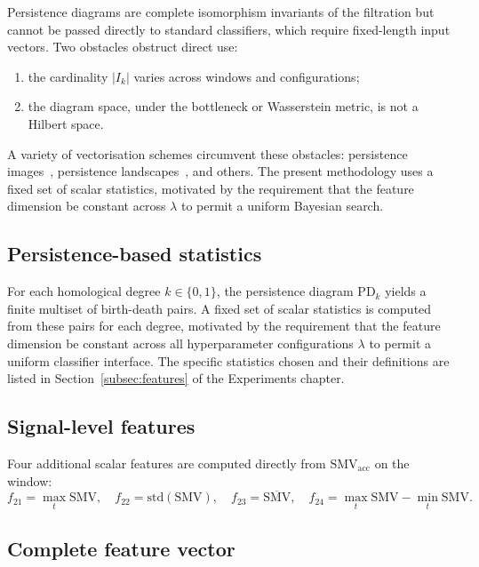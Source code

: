 \documentclass[onluarkali,ingilizce,yukseklisans,karton,LisansustuEgitim]{itutez}
\providecommand{\1}{\mathbf{1}}
\providecommand{\PD}{\mathrm{PD}}
\begin{document}
Persistence diagrams are complete isomorphism invariants of the filtration but cannot be passed directly to standard classifiers, which require fixed-length input vectors. Two obstacles obstruct direct use:
\begin{enumerate}[label=(\roman*)]
  \item the cardinality $|I_k|$ varies across windows and configurations;
  \item the diagram space, under the bottleneck or Wasserstein metric, is not a Hilbert space.
\end{enumerate}
A variety of vectorisation schemes circumvent these obstacles: persistence images~\parencite{adams2017persistence}, persistence landscapes~\parencite{bubenik2015statistical}, and others. The present methodology uses a fixed set of scalar statistics, motivated by the requirement that the feature dimension be constant across $\lambda$ to permit a uniform Bayesian search.

\subsection{Persistence-based statistics}
\label{subsubsec:stats-topo}

For each homological degree $k\in\{0,1\}$, the persistence diagram $\PD_k$ yields a finite multiset of birth-death pairs. A fixed set of scalar statistics is computed from these pairs for each degree, motivated by the requirement that the feature dimension be constant across all hyperparameter configurations $\lambda$ to permit a uniform classifier interface. The specific statistics chosen and their definitions are listed in Section~\ref{subsec:features} of the Experiments chapter.

\subsection{Signal-level features}
\label{subsubsec:signal-feats}

Four additional scalar features are computed directly from $\mathrm{SMV}_{\mathrm{acc}}$ on the window:
\begin{equation}
  f_{21}=\max_t\mathrm{SMV},\quad
  f_{22}=\mathrm{std}(\mathrm{SMV}),\quad
  f_{23}=\overline{\mathrm{SMV}},\quad
  f_{24}=\max_t\mathrm{SMV}-\min_t\mathrm{SMV}.
  \label{eq:sig-feats}
\end{equation}

\subsection{Complete feature vector}
\label{subsubsec:full-vec}
\end{document}
